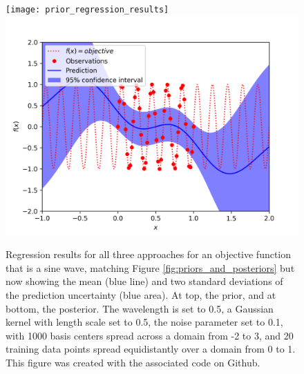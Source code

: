 \documentclass{article}
\begin{document}
\begin{figure}
    \begin{center}
    \texttt{[image: prior\_regression\_results]}
    \includegraphics[width=0.75\linewidth]{regression_results}
    \caption{Regression results for all three approaches for an objective function that is a sine wave, matching Figure \ref{fig:priors_and_posteriors} but now showing the mean (blue line) and two standard deviations of the prediction uncertainty (blue area). At top, the prior, and at bottom, the posterior. The wavelength is set to 0.5, a Gaussian kernel with length scale set to 0.5, the noise parameter set to 0.1, with 1000 basis centers spread across a domain from -2 to 3, and 20 training data points spread equidistantly over a domain from 0 to 1. This figure was created with the associated code on Github.}
    \label{fig:example_regression}
    \end{center}
\end{figure}
\end{document}
